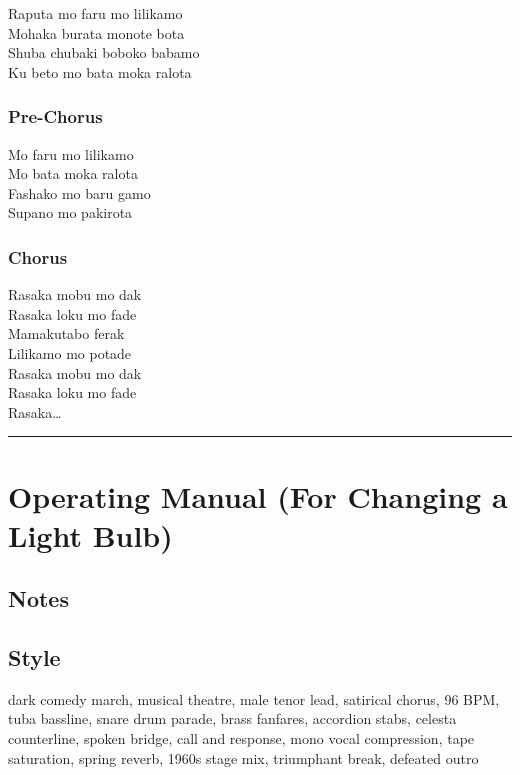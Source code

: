 Raputa mo faru mo lilikamo\\
Mohaka burata monote bota\\
Shuba chubaki boboko babamo\\
Ku beto mo bata moka ralota

\subsubsection{Pre-Chorus}\label{pre-chorus-23}

Mo faru mo lilikamo\\
Mo bata moka ralota\\
Fashako mo baru gamo\\
Supano mo pakirota

\subsubsection{Chorus}\label{chorus-46}

Rasaka mobu mo dak\\
Rasaka loku mo fade\\
Mamakutabo ferak\\
Lilikamo mo potade\\
Rasaka mobu mo dak\\
Rasaka loku mo fade\\
Rasaka\ldots{}

\begin{center}\rule{0.5\linewidth}{0.5pt}\end{center}

\section{Operating Manual (For Changing a Light
Bulb)}\label{operating-manual-for-changing-a-light-bulb}

\subsection{Notes}\label{notes-38}

\subsection{Style}\label{style-37}

dark comedy march, musical theatre, male tenor lead, satirical chorus,
96 BPM, tuba bassline, snare drum parade, brass fanfares, accordion
stabs, celesta counterline, spoken bridge, call and response, mono vocal
compression, tape saturation, spring reverb, 1960s stage mix, triumphant
break, defeated outro

